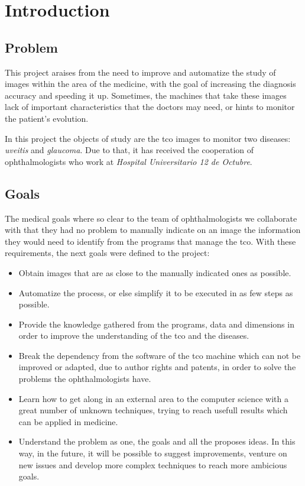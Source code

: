 \chapter{Introduction}
\section{Problem}
This project araises from the need to improve and automatize the
study of images within the area of the medicine, with the goal of 
increasing the diagnosis accuracy and speeding it up. Sometimes, the
machines that take these images lack of important characteristics 
that the doctors may need, or hints to monitor the patient's evolution.

In this project the objects of study are the \gls{tco} images to monitor
two diseases: \emph{\gls{uveitis}} and \emph{\gls{glaucoma}}. Due to that,
it has received the cooperation of ophthalmologists who work at
\emph{Hospital Universitario 12 de Octubre}.

\section{Goals}
The medical goals where so clear to the team of ophthalmologists
we collaborate with that they had no problem to manually indicate on an
image the information they would need to identify from the programs that 
manage the \gls{tco}. With these requirements, the next goals were defined 
to the project:
\begin{itemize}
\item Obtain images that are as close to the manually indicated ones as possible.
\item Automatize the process, or else simplify it to be executed in as few steps as possible.
\item Provide the knowledge gathered from the programs, data and 
dimensions in order to improve the understanding of the \gls{tco} and
the diseases.
\item Break the dependency from the software of the \gls{tco} machine
which can not be improved or adapted, due to author rights and patents, 
in order to solve the problems the ophthalmologists have.
\item Learn how to get along in an external area to the computer science
with a great number of unknown techniques, trying to reach usefull 
results which can be applied in medicine.
\item Understand the problem as one, the goals and all the proposes ideas.
In this way, in the future, it will be possible to suggest improvements, venture
on new issues and develop more complex techniques to reach more
ambicious goals.
\end{itemize}

